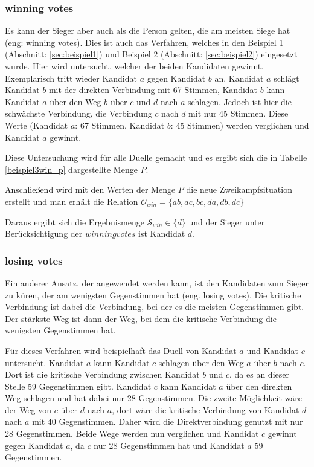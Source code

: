 \subsubsection{winning votes}
\label{sec:winningVotes}
Es kann der Sieger aber auch als die Person gelten, die am meisten Siege hat (eng: winning votes). Dies ist auch das Verfahren, welches in den Beispiel 1 (Abschnitt: \ref{sec:beispiel1}) und Beispiel 2 (Abschnitt: \ref{sec:beispiel2}) eingesetzt wurde. Hier wird untersucht, welcher der beiden Kandidaten gewinnt. Exemplarisch tritt wieder Kandidat $a$ gegen Kandidat $b$ an. Kandidat $a$ schlägt Kandidat $b$ mit der direkten Verbindung mit 67 Stimmen, Kandidat $b$ kann Kandidat $a$ über den Weg $b$ über $c$ und $d$ nach $a$ schlagen. Jedoch ist hier die schwächste Verbindung, die Verbindung $c$ nach $d$ mit nur 45 Stimmen. Diese Werte (Kandidat $a$: 67 Stimmen, Kandidat $b$: 45 Stimmen) werden verglichen und Kandidat $a$ gewinnt. 

Diese Untersuchung wird für alle Duelle gemacht und es ergibt sich die in Tabelle \ref{beispiel3win_p} dargestellte Menge $P$.




Anschließend wird mit den Werten der Menge $P$ die neue Zweikampfsituation erstellt und man erhält die Relation $\mathcal{O}_{win} = \{ ab,ac,bc,da,db,dc \}$

Daraus ergibt sich die Ergebnismenge $\mathcal{S}_{win} \in \{d\}$ und der Sieger unter Berücksichtigung der $winning votes$ ist Kandidat $d$.


\subsubsection{losing votes}
\label{sec:lose}
Ein anderer Ansatz, der angewendet werden kann, ist den Kandidaten zum Sieger zu küren, der am wenigsten Gegenstimmen hat (eng. losing votes). Die kritische Verbindung ist dabei die Verbindung, bei der es die meisten Gegenstimmen gibt. Der stärkste Weg ist dann der Weg, bei dem die kritische Verbindung die wenigsten Gegenstimmen hat.

Für dieses Verfahren wird beispielhaft das Duell von Kandidat $a$ und Kandidat $c$ untersucht. Kandidat $a$ kann Kandidat $c$ schlagen über den Weg $a$ über $b$ nach $c$. Dort ist die kritische Verbindung zwischen Kandidat $b$ und $c$, da es an dieser Stelle 59 Gegenstimmen gibt. 
Kandidat $c$ kann Kandidat $a$ über den direkten Weg schlagen und hat dabei nur 28 Gegenstimmen. Die zweite Möglichkeit wäre der Weg von $c$ über $d$ nach $a$, dort wäre die kritische Verbindung von Kandidat $d$ nach $a$ mit 40 Gegenstimmen. Daher wird die Direktverbindung genutzt mit nur 28 Gegenstimmen.
Beide Wege werden nun verglichen und Kandidat $c$ gewinnt gegen Kandidat $a$, da $c$ nur 28 Gegenstimmen hat und Kandidat $a$ 59 Gegenstimmen.

